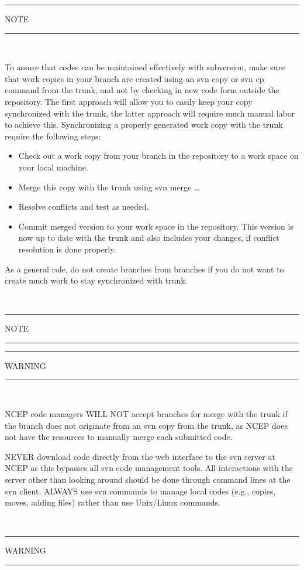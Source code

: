 \documentclass[12pt]{article}
\newcommand{\file}{\sf}
\newcommand{\pb}{\strut \vfill \pagebreak}
\begin{document}
\pb

\begin{center}
\rule[1mm]{55mm}{1.0mm} NOTE \rule[1mm]{55mm}{1.0mm} \\ 
\vspace{\baselineskip} \label{svn_n}
\parbox{120mm}{To assure that codes can be maintained effectively with
  subversion, make sure that work copies in your branch are created using an
  {\file svn copy} or {\file svn cp} command from the trunk, and not by
  checking in new code form outside the repository. The first approach will
  allow you to easily keep your copy synchronized with the trunk, the latter
  approach will require much manual labor to achieve this. Synchronizing a
  properly generated work copy with the trunk require the following steps:
\begin{itemize}
\item Check out a work copy from your branch in the repository to a work space
      on your local machine.
\item Merge this copy with the trunk using {\file svn merge \ldots}
\item Resolve conflicts and test as needed.
\item Commit merged version to your work space in the repository. This version
      is now up to date with the trunk and also includes your changes, if
      conflict resolution is done properly.
\end{itemize}
As a general rule, do not create branches from branches if you do not want to
create much work to stay synchronized with trunk.} \\
\vspace{\baselineskip} \rule[1mm]{55mm}{1.0mm} NOTE \rule[1mm]{55mm}{1.0mm}
\end{center}

\vspace{\baselineskip}
\begin{center}
\rule[1mm]{55mm}{1.0mm} WARNING \rule[1mm]{55mm}{1.0mm} \\ 
\vspace{\baselineskip} \label{svn_w}
\parbox{120mm}{NCEP code managers WILL NOT accept branches for merge with the
trunk if the branch does not originate from an {\file svn copy} from the
trunk, as NCEP does not have the resources to manually merge each submitted
code.

\vspace{\baselineskip} \noindent 
NEVER download code directly from the web interface to the svn server at NCEP
as this bypasses all svn code management tools. All interactions with the
server other than looking around should be done through command lines at the
svn client. ALWAYS use svn commands to manage local codes (e.g., copies,
moves, adding files) rather than use Unix/Linux commands.} \\
\vspace{\baselineskip} \rule[1mm]{55mm}{1.0mm} WARNING \rule[1mm]{55mm}{1.0mm}
\end{center}
\end{document}
